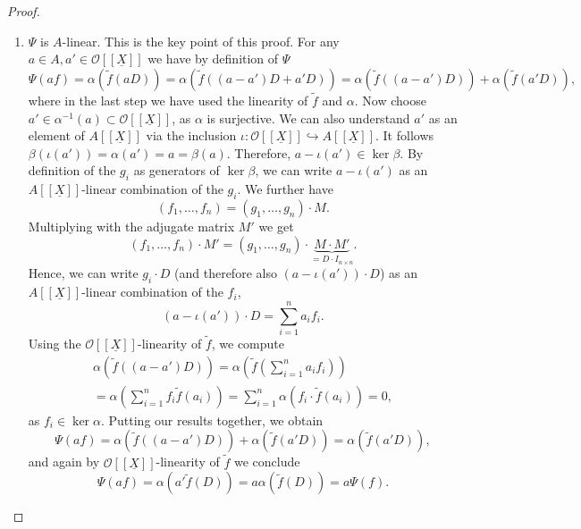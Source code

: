 \documentclass{article}
\theoremstyle{plain}%
\theoremstyle{definition}
\theoremstyle{remark}
\begin{document}
\begin{proof}
    \begin{enumerate}
        \item \(\Psi\) is \(A\)-linear. This is the key point of this proof.
        For any \(a \in A, a' \in \mathcal{O}[[\underline{X}]]\) we have by definition of \(\Psi\)
        \[
            \Psi(af) = \alpha(\tilde f(aD)) = \alpha(\tilde f((a - a')D + a'D))
            = \alpha(\tilde f((a-a')D)) + \alpha(\tilde f(a'D)),
        \]
        where in the last step we have used the linearity of \(\tilde f\) and \(\alpha\).
        Now choose \(a' \in \alpha^{-1}(a) \subset \mathcal{O}[[\underline{X}]]\), as \(\alpha\) is surjective.
        We can also understand \(a'\) as an element of \(A[[\underline{X}]]\) via the inclusion
        \(\iota\colon\mathcal{O}[[\underline{X}]] \hookrightarrow A[[\underline{X}]]\).
        It follows \(\beta(\iota(a')) = \alpha(a') = a = \beta(a)\). Therefore, \(a - \iota(a') \in \ker \beta\).
        By definition of the \(g_i\) as generators of \(\ker \beta\), we can write \(a - \iota(a')\) as an 
        \(A[[\underline{X}]]\)-linear combination of the \(g_i\).
        We further have
        \[
            (f_1, \dots, f_n) = (g_1, \dots, g_n) \cdot M.
        \]
        Multiplying with the adjugate matrix \(M'\) we get
        \[  
            (f_1, \dots, f_n) \cdot M' = (g_1, \dots, g_n) \cdot \underbrace{M \cdot M'}_{= D \cdot I_{n\times n}}.
        \]
        Hence, we can write \(g_i \cdot D\) (and therefore also \((a - \iota(a'))\cdot D\)) 
        as an \(A[[\underline{X}]]\)-linear combination of the \(f_i\),
        \[
            (a - \iota(a'))\cdot D = \sum_{i=1}^n a_i f_i.
        \]
        Using the \(\mathcal{O}[[\underline{X}]]\)-linearity of \(\tilde f\), we compute
        \begin{multline*}
            \alpha(\tilde f((a-a')D)) = \alpha\left(\tilde{f}\left(\sum_{i=1}^n a_i f_i\right)\right)\\
            = \alpha\left(\sum_{i=1}^n f_i \tilde{f}(a_i)\right) = \sum_{i=1}^n \alpha(f_i \cdot \tilde{f}(a_i)) = 0,
        \end{multline*}
        as \(f_i \in \ker \alpha\).
        Putting our results together, we obtain
        \[
            \Psi(af) = \alpha(\tilde f((a-a')D)) + \alpha(\tilde f(a'D)) = \alpha(\tilde f(a'D)),
        \]
        and again by \(\mathcal{O}[[\underline{X}]]\)-linearity of \(\tilde f\) we conclude
        \[
            \Psi(af) = \alpha(a'\tilde f(D)) = a \alpha(\tilde f(D)) = a \Psi(f).
        \]

\end{enumerate}
\end{proof}
\end{document}
